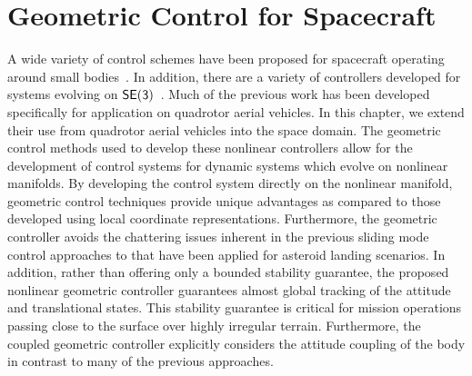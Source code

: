 
\chapter{Geometric Control for Spacecraft}\label{sec:se3_control}

A wide variety of control schemes have been proposed for spacecraft operating around small bodies~\cite{furfaro2013,li2011a}.
In addition, there are a  variety of controllers developed for systems evolving on \( \mathsf{SE(3)} \)~\cite{lee2010,lee2013}.
Much of the previous work has been developed specifically for application on quadrotor aerial vehicles.
In this chapter, we extend their use from quadrotor aerial vehicles into the space domain. 
The geometric control methods used to develop these nonlinear controllers allow for the development of control systems for dynamic systems which evolve on nonlinear manifolds. 
By developing the control system directly on the nonlinear manifold, geometric control techniques provide unique advantages as compared to those developed using local coordinate representations.
Furthermore, the geometric controller avoids the chattering issues inherent in the previous sliding mode control approaches to that have been applied for asteroid landing scenarios.
In addition, rather than offering only a bounded stability guarantee, the proposed nonlinear geometric controller guarantees almost global tracking of the attitude and translational states. 
This stability guarantee is critical for mission operations passing close to the surface over highly irregular terrain.
Furthermore, the coupled geometric controller explicitly considers the attitude coupling of the body in contrast to many of the previous approaches.

